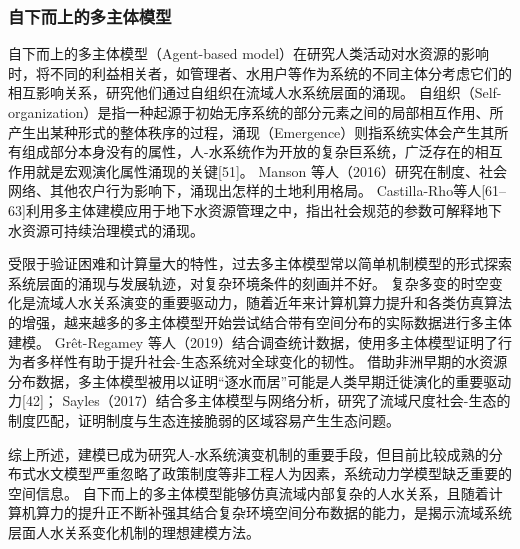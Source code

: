 \subsubsection*{自下而上的多主体模型}
自下而上的多主体模型（Agent-based model）在研究人类活动对水资源的影响时，将不同的利益相关者，如管理者、水用户等作为系统的不同主体分考虑它们的相互影响关系，研究他们通过自组织在流域人水系统层面的涌现。
自组织（Self-organization）是指一种起源于初始无序系统的部分元素之间的局部相互作用、所产生出某种形式的整体秩序的过程，涌现（Emergence）则指系统实体会产生其所有组成部分本身没有的属性，人-水系统作为开放的复杂巨系统，广泛存在的相互作用就是宏观演化属性涌现的关键[51]。
Manson 等人（2016）研究在制度、社会网络、其他农户行为影响下，涌现出怎样的土地利用格局\cite{manson2016}。
Castilla-Rho等人[61–63]利用多主体建模应用于地下水资源管理之中，指出社会规范的参数可解释地下水资源可持续治理模式的涌现。

受限于验证困难和计算量大的特性，过去多主体模型常以简单机制模型的形式探索系统层面的涌现与发展轨迹，对复杂环境条件的刻画并不好。
复杂多变的时空变化是流域人水关系演变的重要驱动力，随着近年来计算机算力提升和各类仿真算法的增强，越来越多的多主体模型开始尝试结合带有空间分布的实际数据进行多主体建模。
Grêt-Regamey 等人（2019）结合调查统计数据，使用多主体模型证明了行为者多样性有助于提升社会-生态系统对全球变化的韧性。
借助非洲早期的水资源分布数据，多主体模型被用以证明“逐水而居”可能是人类早期迁徙演化的重要驱动力[42]；
Sayles（2017）结合多主体模型与网络分析，研究了流域尺度社会-生态的制度匹配，证明制度与生态连接脆弱的区域容易产生生态问题。 %

综上所述，建模已成为研究人-水系统演变机制的重要手段，但目前比较成熟的分布式水文模型严重忽略了政策制度等非工程人为因素，系统动力学模型缺乏重要的空间信息。
自下而上的多主体模型能够仿真流域内部复杂的人水关系，且随着计算机算力的提升正不断补强其结合复杂环境空间分布数据的能力，是揭示流域系统层面人水关系变化机制的理想建模方法。
